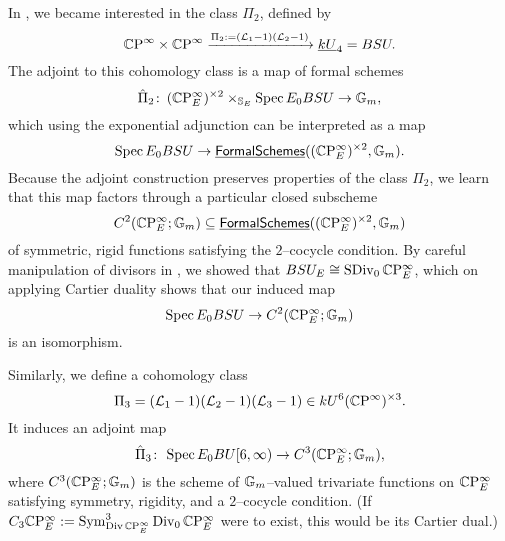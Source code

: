 In , we became interested in the class $\Pi_2$, defined by \[\mathbb{C}\mathrm P^\infty \times \mathbb{C}\mathrm P^\infty \xrightarrow{\Pi_2 := (\mathcal{L}_1 - 1)(\mathcal{L}_2 - 1)} \underline{\smash{kU}}_{4} = BSU.\]  The adjoint to this cohomology class is a map of formal schemes \[\hat \Pi_2\colon\thinspace (\mathbb{C}\mathrm P^\infty_E)^{\times 2} \times_{\mathbb S_E} \operatorname{Spec} E_0 BSU \to \mathbb G_m,\]  which using the exponential adjunction can be interpreted as a map \[\operatorname{Spec} E_0 BSU \to \operatorname{\underline{\smash{\mathsf{FormalSchemes}}}}((\mathbb{C}\mathrm P^\infty_E)^{\times 2}, \mathbb G_m).\]  Because the adjoint construction preserves properties of the class $\Pi_2$, we learn that this map factors through a particular closed subscheme \[C^2(\mathbb{C}\mathrm P^\infty_E; \mathbb G_m) \subseteq \operatorname{\underline{\smash{\mathsf{FormalSchemes}}}}((\mathbb{C}\mathrm P^\infty_E)^{\times 2}, \mathbb G_m)\] of symmetric, rigid functions satisfying the $2$--cocycle condition.  By careful manipulation of divisors in , we showed that $BSU_E \cong \operatorname{SDiv}_0 \mathbb{C}\mathrm P^\infty_E$, which on applying Cartier duality  shows that our induced map \[\operatorname{Spec} E_0 BSU \to C^2(\mathbb{C}\mathrm P^\infty_E; \mathbb G_m)\] is an isomorphism.

\begin{definition}
Similarly, we define a cohomology class \[\Pi_3 = (\mathcal{L}_1 - 1)(\mathcal{L}_2 - 1)(\mathcal{L}_3 - 1) \in kU^6(\mathbb{C}\mathrm P^\infty)^{\times 3}.\]  It induces an adjoint map \[\hat \Pi_3\colon\thinspace \operatorname{Spec} E_0 BU[6, \infty) \to C^3(\mathbb{C}\mathrm P^\infty_E; \mathbb G_m),\] where $C^3(\mathbb{C}\mathrm P^\infty_E; \mathbb G_m)$ is the scheme of $\mathbb G_m$--valued trivariate functions on $\mathbb{C}\mathrm P^\infty_E$ satisfying symmetry, rigidity, and a $2$--cocycle condition.  (If $C_3 \mathbb{C}\mathrm P^\infty_E := \operatorname{Sym}^3_{\operatorname{Div} \mathbb{C}\mathrm P^\infty_E} \operatorname{Div}_0 \mathbb{C}\mathrm P^\infty_E$ were to exist, this would be its Cartier dual.)
\end{definition}

